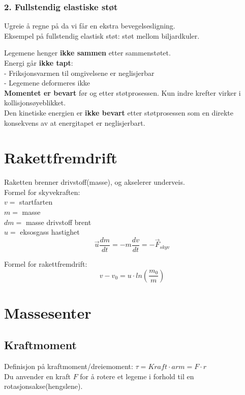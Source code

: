 \documentclass[12pt]{article}
\begin{document}
\subsubsection{2. Fullstendig elastiske støt}
Ugreie å regne på da vi får en ekstra bevegelsesligning.\\
Eksempel på fullstendig elastisk støt: støt mellom biljardkuler.

Legemene henger \textbf{ikke sammen} etter sammenstøtet.\\
\bigskip
Energi går \textbf{ikke tapt}:\\
- Friksjonsvarmen til omgivelsene er neglisjerbar\\
- Legemene deformeres ikke\\
\bigskip
\textbf{Momentet er bevart} før og etter støtprosessen. Kun indre krefter virker i kollisjonsøyeblikket.\\
\bigskip
Den kinetiske energien er \textbf{ikke bevart} etter støtprosessen som en direkte konsekvens av at energitapet er neglisjerbart.\\
\bigskip

\section{Rakettfremdrift}
Raketten brenner drivstoff(masse), og akselerer underveis.\\
\bigskip
Formel for skyvekraften:\\
$v =$ startfarten\\
$m =$ masse\\
$dm =$ masse drivstoff brent\\
$u =$ eksosgass hastighet\\

$$\Vec{u}\frac{dm}{dt} = -m\frac{dv}{dt} = -\Vec{F}_{skyv}$$

Formel for rakettfremdrift:
$$v-v_0 = u\cdot ln(\frac{m_0}{m})$$

\section{Massesenter}
\subsection{Kraftmoment}
Definisjon på kraftmoment/dreiemoment: $\tau = Kraft \cdot arm = F\cdot r$\\
Du anvender en kraft $F$ for å rotere et legeme i forhold til en rotasjonsakse(hengslene).
\end{document}
